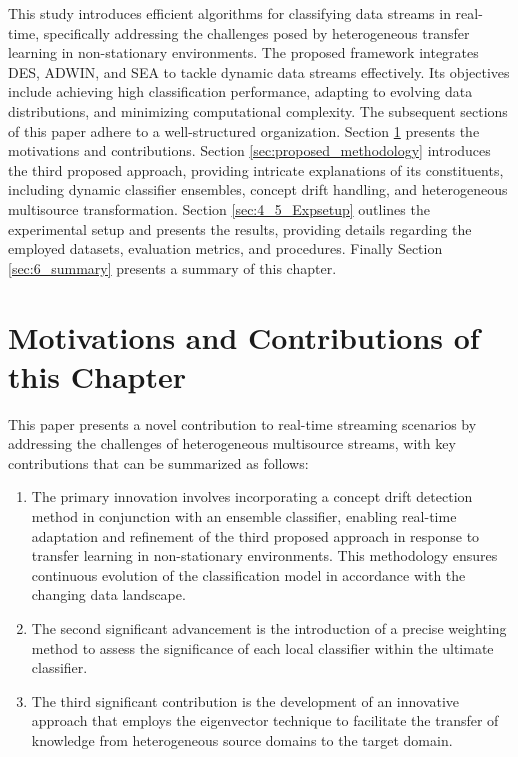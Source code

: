 This study introduces efficient algorithms for classifying data streams in real-time, specifically addressing the challenges posed by heterogeneous transfer learning in non-stationary environments. The proposed framework integrates DES, ADWIN, and SEA to tackle dynamic data streams effectively. Its objectives include achieving high classification performance, adapting to evolving data distributions, and minimizing computational complexity.
The subsequent sections of this paper adhere to a well-structured organization. Section \ref{sec:6_2_motivation} presents the motivations and contributions. Section \ref{sec:proposed_methodology} introduces the third proposed approach, providing intricate explanations of its constituents, including dynamic classifier ensembles, concept drift handling, and heterogeneous multisource transformation. Section \ref{sec:4_5_Expsetup} outlines the experimental setup and presents the results, providing details regarding the employed datasets, evaluation metrics, and procedures. Finally Section \ref{sec:6_summary} presents a summary of this chapter.

\section{Motivations and Contributions of this Chapter} \label{sec:6_2_motivation}
This paper presents a novel contribution to real-time streaming scenarios by addressing the challenges of heterogeneous multisource streams, with key contributions that can be summarized as follows:
\begin{enumerate}[nosep]
  \setlength{\itemsep}{0pt}
  \setlength{\parskip}{0pt}
  \item The primary innovation involves incorporating a concept drift detection method in conjunction with an ensemble classifier, enabling real-time adaptation and refinement of the third proposed approach in response to transfer learning in non-stationary environments. This methodology ensures continuous evolution of the classification model in accordance with the changing data landscape.
  \item The second significant advancement is the introduction of a precise weighting method to assess the significance of each local classifier within the ultimate classifier.
 \item The third significant contribution is the development of an innovative approach that employs the eigenvector technique to facilitate the transfer of knowledge from heterogeneous source domains to the target domain.
  \end{enumerate} 
 
   

